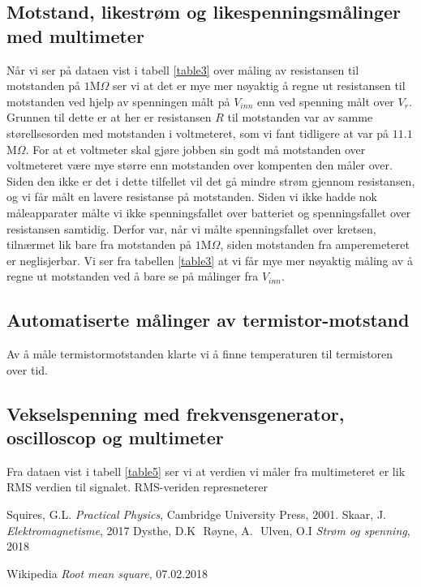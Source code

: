 \documentclass[%
 reprint,
 amsmath,amssymb,
 aps,
]{revtex4-1}
\begin{document}
\subsection{Motstand, likestrøm og likespenningsmålinger med multimeter}
Når vi ser på dataen vist i tabell \vref{table3} over måling av resistansen til motstanden på $1$M$\Omega$ ser vi at det er mye mer nøyaktig å regne ut resistansen til motstanden ved hjelp av spenningen målt på $V_{inn}$ enn ved spenning målt over $V_r$. Grunnen til dette er at her er resistansen $R$ til motstanden var av samme størellsesorden med motstanden i voltmeteret, som vi fant tidligere at var på $11.1$M$\Omega$. For at et voltmeter skal gjøre jobben sin godt må motstanden over voltmeteret være mye større enn motstanden over kompenten den måler over. Siden den ikke er det i dette tilfellet vil det gå mindre strøm gjennom resistansen, og vi får målt en lavere resistanse på motstanden. Siden vi ikke hadde nok måleapparater målte vi ikke spenningsfallet over batteriet og spenningsfallet over resistansen samtidig. Derfor var, når vi målte spenningsfallet over kretsen, tilnærmet lik bare fra motstanden på $1$M$\Omega$, siden motstanden fra amperemeteret er neglisjerbar. Vi ser fra tabellen \vref{table3} at vi får mye mer nøyaktig måling av å regne ut motstanden ved å bare se på målinger fra $V_{inn}$.
\subsection{Automatiserte målinger av termistor-motstand}
Av å måle termistormotstanden klarte vi å finne temperaturen til termistoren over tid.
\subsection{Vekselspenning med frekvensgenerator, oscilloscop og multimeter}
Fra dataen vist i tabell \vref{table5} ser vi at verdien vi måler fra multimeteret er lik RMS verdien til signalet. RMS-veriden represneterer 



\begin{thebibliography}{9}
Squires, G.L. \emph{Practical Physics}, Cambridge University Press, 2001.
Skaar, J. \emph{Elektromagnetisme}, 2017
Dysthe, D.K\,\, Røyne, A.\,\, Ulven, O.I \emph{Strøm og spenning}, 2018

Wikipedia \emph{Root mean square}, 07.02.2018

\end{thebibliography}
\end{document}
